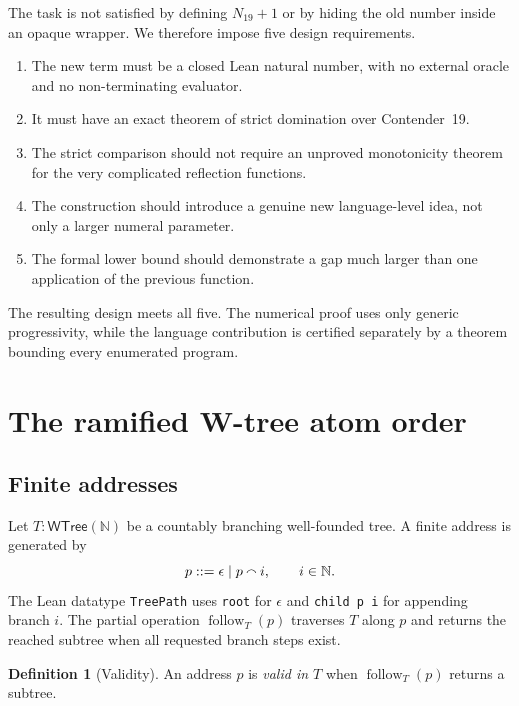 \documentclass[11pt]{article}
\theoremstyle{definition}
\newtheorem{definition}[theorem]{Definition}
\theoremstyle{remark}
\newcommand{\WTree}{\mathsf{WTree}}
\begin{document}
The task is not satisfied by defining $N_{19}+1$ or by hiding the old number
inside an opaque wrapper.  We therefore impose five design requirements.

\begin{enumerate}[leftmargin=2.2em]
\item The new term must be a closed Lean natural number, with no external
  oracle and no non-terminating evaluator.
\item It must have an exact theorem of strict domination over Contender~19.
\item The strict comparison should not require an unproved monotonicity theorem
  for the very complicated reflection functions.
\item The construction should introduce a genuine new language-level idea,
  not only a larger numeral parameter.
\item The formal lower bound should demonstrate a gap much larger than one
  application of the previous function.
\end{enumerate}

The resulting design meets all five.  The numerical proof uses only generic
progressivity, while the language contribution is certified separately by a
theorem bounding every enumerated program.

\section{The ramified W-tree atom order}
\label{sec:wtree-order}

\subsection{Finite addresses}

Let $T:\WTree(\mathbb N)$ be a countably branching well-founded tree.  A finite
address is generated by
\[
  p ::= \epsilon \mid p\mathbin{\raisebox{0.15ex}{$\smallfrown$}}i,
  \qquad i\in\mathbb N.
\]
The Lean datatype \texttt{TreePath} uses \texttt{root} for $\epsilon$ and
\texttt{child p i} for appending branch $i$.  The partial operation
$\operatorname{follow}_T(p)$ traverses $T$ along $p$ and returns the reached
subtree when all requested branch steps exist.

\begin{definition}[Validity]
An address $p$ is \emph{valid in $T$} when
$\operatorname{follow}_T(p)$ returns a subtree.
\end{definition}
\end{document}
